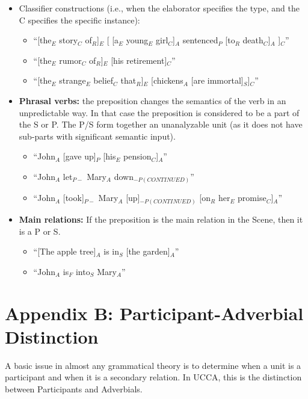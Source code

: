 \documentclass[11pt]{article}
\begin{document}
\begin{enumerate}
\begin{itemize}
\item
Classifier constructions (i.e., when the elaborator specifies the type, and the C specifies the specific instance):

\begin{itemize}
\item
``[the$_E$ story$_C$ of$_R$]$_E$ [ [a$_E$ young$_E$ girl$_C$]$_A$ sentenced$_P$ [to$_R$ death$_C$]$_A$ ]$_C$''
\item
``[the$_E$ rumor$_C$ of$_R$]$_E$ [his retirement]$_C$''
\item
``[the$_E$ strange$_E$ belief$_C$ that$_R$]$_E$ [chickens$_A$ [are immortal]$_S$]$_C$''
\end{itemize}

\item
{\bf Phrasal verbs:} the preposition changes the semantics of the verb in an unpredictable way. In that case the preposition is considered to be a part of the S or P. The P/S form together an unanalyzable unit (as it does not have sub-parts with significant semantic input).

\begin{itemize}
\item
``John$_A$ [gave up]$_P$ [his$_E$ pension$_C$]$_A$''
\item
``John$_A$ let$_{P-}$ Mary$_A$ down$_{-P(CONTINUED)}$''
\item
``John$_A$ [took]$_{P-}$ Mary$_A$ [up]$_{-P(CONTINUED)}$ [on$_R$ her$_E$ promise$_C$]$_A$''
\end{itemize}

\item
{\bf Main relations:} If the preposition is the main relation in the Scene, then it is a P or S.

\begin{itemize}
\item
``[The apple tree]$_A$ is in$_S$ [the garden]$_A$''
\item
``John$_A$ is$_F$ into$_S$ Mary$_A$''
\end{itemize}


\end{itemize}

\end{enumerate}

\section{\large Appendix B: Participant-Adverbial Distinction}

A basic issue in almost any grammatical theory is to determine when a unit is a participant and when it is a secondary relation. In UCCA, this is the distinction between Participants and Adverbials.
\end{document}
